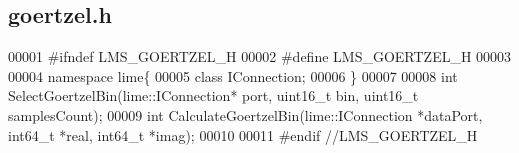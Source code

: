 \subsection{goertzel.\+h}
\label{goertzel_8h_source}

\begin{DoxyCode}
00001 \textcolor{preprocessor}{#ifndef LMS\_GOERTZEL\_H}
00002 \textcolor{preprocessor}{#define LMS\_GOERTZEL\_H}
00003 
00004 \textcolor{keyword}{namespace }lime\{
00005 \textcolor{keyword}{class }IConnection;
00006 \}
00007 
00008 \textcolor{keywordtype}{int} SelectGoertzelBin(lime::IConnection* port, uint16\_t bin, uint16\_t samplesCount);
00009 \textcolor{keywordtype}{int} CalculateGoertzelBin(lime::IConnection *dataPort, int64\_t *real, int64\_t *imag);
00010 
00011 \textcolor{preprocessor}{#endif //LMS\_GOERTZEL\_H}
\end{DoxyCode}
